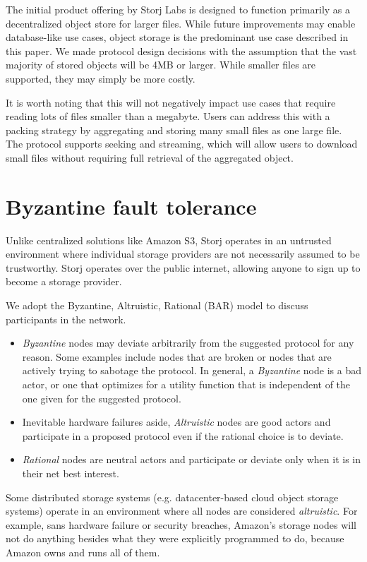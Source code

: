 \documentclass[8pt,fleqn,openany]{book}
\begin{document}
The initial product offering by Storj Labs is designed to function primarily as
a decentralized object store for larger files.
While future improvements may enable
database-like use cases, object storage is the predominant use case described in
this paper. We made protocol design decisions with the assumption that the
vast majority of stored objects will be 4MB or larger. While smaller files are
supported, they may simply be more costly.

It is worth noting that this will not negatively impact use cases that
require reading lots of files smaller than a megabyte. Users can address this
with a packing strategy by aggregating and storing many small files as one
large file.
The protocol supports seeking and streaming, which will allow users to download small files
without requiring full retrieval of the aggregated object.

\section{Byzantine fault tolerance}

Unlike centralized solutions like Amazon S3, Storj operates in an untrusted
environment where individual storage providers are not necessarily assumed to be
trustworthy. Storj operates over the public internet, allowing anyone to sign
up to become a storage provider.

We adopt the Byzantine, Altruistic, Rational (BAR) model \cite{bar} to discuss
participants in the network.

\begin{itemize}
\item {\em Byzantine} nodes may deviate arbitrarily from the suggested
  protocol for any reason. Some examples include nodes that are broken or nodes
  that are actively trying to sabotage the protocol. In general, a
  {\em Byzantine} node is a bad actor, or one that optimizes for a utility
  function that is independent of the one given for the suggested protocol.
\item Inevitable hardware failures aside, {\em Altruistic} nodes are good
  actors and participate in a proposed protocol even if the rational choice is
  to deviate.
\item {\em Rational} nodes are neutral actors and participate or deviate only
  when it is in their net best interest.
\end{itemize}

Some distributed storage systems (e.g. datacenter-based cloud object storage systems)
operate in an environment
where all nodes are considered {\em altruistic}. For example, sans hardware failure
or security breaches, Amazon's storage nodes
will not do anything besides what they were explicitly programmed to do,
because Amazon owns and runs all of them.
\end{document}
